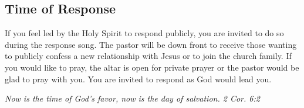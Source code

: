 \vspace{\fill}

\subsection{Time of Response}
\label{timeofresponse}

If you feel led by the Holy Spirit to respond publicly, you are invited to do so during the response song. The pastor will be down front to receive those wanting to publicly confess a new relationship with Jesus or to join the church family. If you would like to pray, the altar is open for private prayer or the pastor would be glad to pray with you. You are invited to respond as God would lead you.

\small\textit{    Now is the time of God's favor, now is the day of salvation. 2 Cor. 6:2}

\normalsize{}

\vspace{\fill}

